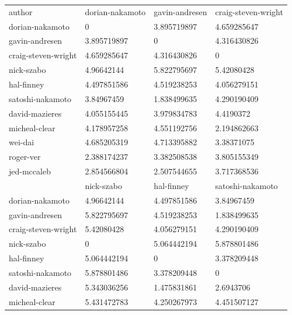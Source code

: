 \documentclass{article}%
\begin{document}
\begin{table}[]
\begin{tabular}{llll}
author              & dorian-nakamoto & gavin-andresen & craig-steven-wright \\
dorian-nakamoto     & 0               & 3.895719897    & 4.659285647         \\
gavin-andresen      & 3.895719897     & 0              & 4.316430826         \\
craig-steven-wright & 4.659285647     & 4.316430826    & 0                   \\
nick-szabo          & 4.96642144      & 5.822795697    & 5.42080428          \\
hal-finney          & 4.497851586     & 4.519238253    & 4.056279151         \\
satoshi-nakamoto    & 3.84967459      & 1.838499635    & 4.290190409         \\
david-mazieres      & 4.055155445     & 3.979834783    & 4.4190372           \\
micheal-clear       & 4.178957258     & 4.551192756    & 2.194862663         \\
wei-dai             & 4.685205319     & 4.713395882    & 3.38371075          \\
roger-ver           & 2.388174237     & 3.382508538    & 3.805155349         \\
jed-mccaleb         & 2.854566804     & 2.507544655    & 3.717368536         \\
                    & nick-szabo      & hal-finney     & satoshi-nakamoto    \\
dorian-nakamoto     & 4.96642144      & 4.497851586    & 3.84967459          \\
gavin-andresen      & 5.822795697     & 4.519238253    & 1.838499635         \\
craig-steven-wright & 5.42080428      & 4.056279151    & 4.290190409         \\
nick-szabo          & 0               & 5.064442194    & 5.878801486         \\
hal-finney          & 5.064442194     & 0              & 3.378209448         \\
satoshi-nakamoto    & 5.878801486     & 3.378209448    & 0                   \\
david-mazieres      & 5.343036256     & 1.475831861    & 2.6943706           \\
micheal-clear       & 5.431472783     & 4.250267973    & 4.451507127         \\

\end{tabular}
\end{table}
\end{document}
